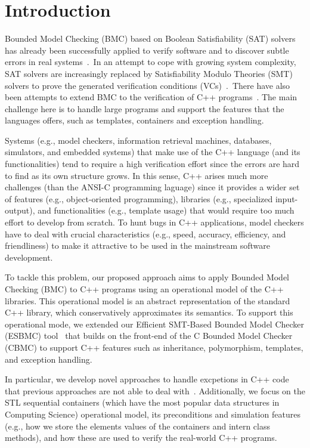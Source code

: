 \documentclass[a4paper]{llncs}
\begin{document}
\section{Introduction}
%
Bounded Model Checking (BMC) based on Boolean Satisfiability (SAT) solvers
has already been successfully applied to verify software and to discover 
subtle errors in real systems~\cite{handbook09}.\ In an attempt to cope
with growing system complexity, SAT solvers are increasingly
replaced by Satisfiability Modulo Theories (SMT) solvers to prove the generated 
verification conditions (VCs)~\cite{Armando09,Ganai06,Cordeiro12}.\
There have also been attempts to extend BMC to the verification of C++ 
programs~\cite{Blanc07,Florian12}. The main challenge here is to handle large 
programs and support the features that the languages offers, such as templates, 
containers and exception handling.

Systems (e.g., model checkers, information retrieval 
machines, databases, simulators, and embedded systems) that make use 
of the C++ language (and its functionalities) tend to require a high 
verification effort since the errors are hard to find as its own structure 
grows. In this sense, C++ arises much more challenges (than the ANSI-C programming 
laguage) since it provides a wider set of features (e.g., object-oriented programming), 
libraries (e.g., specialized input-output), and functionalities (e.g., template usage) that 
would require too much effort to develop from scratch. To hunt bugs in C++ applications, 
model checkers have to deal with crucial characteristics (e.g., speed, accuracy, efficiency, 
and friendliness) to make it attractive to be used in the mainstream software development. 

To tackle this problem, our proposed approach aims to apply Bounded Model Checking (BMC) 
to C++ programs using an operational model of the C++ libraries. This operational model 
is an abstract representation of the standard C++ library, which conservatively approximates 
its semantics. To support this operational mode, we extended our Efficient SMT-Based Bounded
Model Checker (ESBMC) tool~\cite{Cordeiro12} that builds on the front-end of the C Bounded Model 
Checker (CBMC) to support C++ features such as inheritance, polymorphism, templates, and 
exception handling.

In particular, we develop novel approaches to handle excpetions in C++ code that previous approaches
are not able to deal with~\cite{Florian12,PrabhuMBIG11}. Additionally, we focus on the STL sequential 
containers (which have the most popular data structures in Computing Science) operational model, 
its preconditions and simulation features (e.g., how we store the elements values 
of the containers and intern class methods), and how these are used to verify the real-world 
C++ programs.
\end{document}
